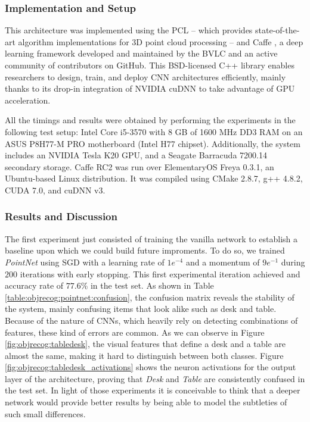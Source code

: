 \subsubsection{Implementation and Setup}

This architecture was implemented using the \ac{PCL} \cite{Rusu2011}\cite{Aldoma2012} – which provides state-of-the-art algorithm implementations for 3D point cloud processing – and Caffe \cite{Jia2014}, a deep learning framework developed and maintained by the \ac{BVLC} and an active community of contributors on GitHub. This BSD-licensed C++ library enables researchers to design, train, and deploy \ac{CNN} architectures efficiently, mainly thanks to its drop-in integration of NVIDIA cuDNN \cite{Chetlur2014} to take advantage of \ac{GPU} acceleration.

All the timings and results were obtained by performing the experiments in the following test setup: Intel Core i5-3570 with 8 GB of 1600 MHz DD3 RAM on an ASUS P8H77-M PRO motherboard (Intel H77 chipset). Additionally, the system includes an NVIDIA Tesla K20 GPU, and a Seagate Barracuda 7200.14 secondary storage. Caffe RC2 was run over ElementaryOS Freya 0.3.1, an Ubuntu-based Linux distribution. It was compiled using CMake 2.8.7, g++ 4.8.2, CUDA 7.0, and cuDNN v3.

\subsubsection{Results and Discussion}
\label{cha:objrecog:sec:pointnet:subsec:discussion}

The first experiment just consisted of training the vanilla network to establish a baseline upon which we could build future improments. To do so, we trained \emph{PointNet} using \ac{SGD} with a learning rate of $1e^{-4}$ and a momentum of $9e^{-1}$ during $200$ iterations with early stopping. This first experimental iteration achieved and accuracy rate of $77.6$\% in the test set. As shown in Table \ref{table:objrecog:pointnet:confusion}, the confusion matrix reveals the stability of the system, mainly confusing items that look alike such as desk and table. Because of the nature of \acp{CNN}, which heavily rely on detecting combinations of features, these kind of errors are common. As we can observe in Figure \ref{fig:objrecog:tabledesk}, the visual features that define a desk and a table are almost the same, making it hard to distinguish between both classes. Figure \ref{fig:objrecog:tabledesk_activations} shows the neuron activations for the output layer of the architecture, proving that \emph{Desk} and \emph{Table} are consistently confused in the test set. In light of those experiments it is conceivable to think that a deeper network would provide better results by being able to model the subtleties of such small differences.

